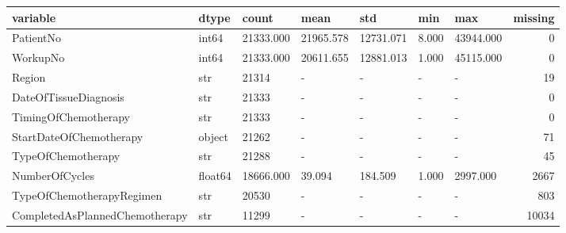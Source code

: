 \begin{tabular}{lllllllr}
\toprule
variable & dtype & count & mean & std & min & max & missing \\
\midrule
PatientNo & int64 & 21333.000 & 21965.578 & 12731.071 & 8.000 & 43944.000 & 0 \\
WorkupNo & int64 & 21333.000 & 20611.655 & 12881.013 & 1.000 & 45115.000 & 0 \\
Region & str & 21314 & - & - & - & - & 19 \\
DateOfTissueDiagnosis & str & 21333 & - & - & - & - & 0 \\
TimingOfChemotherapy & str & 21333 & - & - & - & - & 0 \\
StartDateOfChemotherapy & object & 21262 & - & - & - & - & 71 \\
TypeOfChemotherapy & str & 21288 & - & - & - & - & 45 \\
NumberOfCycles & float64 & 18666.000 & 39.094 & 184.509 & 1.000 & 2997.000 & 2667 \\
TypeOfChemotherapyRegimen & str & 20530 & - & - & - & - & 803 \\
CompletedAsPlannedChemotherapy & str & 11299 & - & - & - & - & 10034 \\
\bottomrule
\end{tabular}
